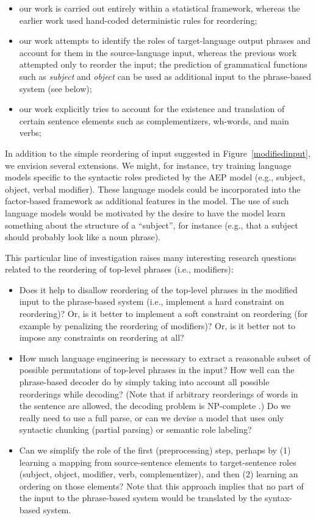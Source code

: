 \documentclass[10pt]{report}
\theoremstyle{plain}
\begin{document}
{\begin{itemize}
\item our work is carried out entirely within a statistical
framework, whereas the earlier work used hand-coded deterministic
rules for reordering;
\item our work attempts to identify the roles of target-language
output phrases and account for them in the source-language input,
whereas the previous work attempted only to reorder the input; the
prediction of grammatical functions such as {\em subject} and {\em
object} can be used as additional input to the phrase-based system
(see below);
\item our work explicitly tries to account for the existence and
translation of certain sentence elements such as complementizers,
wh-words, and main verbs;
\end{itemize}

In addition to the simple reordering of input suggested in
Figure~\ref{modifiedinput}, we envision several extensions. We might,
for instance, try training language models specific to the syntactic
roles predicted by the AEP model (e.g., subject, object, verbal
modifier). These language models could be incorporated into the
factor-based framework as additional features in the model. The use of
such language models would be motivated by the desire to have the
model learn something about the structure of a ``subject'', for
instance (e.g., that a subject should probably look like a noun
phrase).

This particular line of investigation raises many interesting research
questions related to the reordering of top-level phrases (i.e.,
modifiers):

\begin{itemize}
\item Does it help to disallow reordering of the top-level phrases in
the modified input to the phrase-based system (i.e., implement a hard
constraint on reordering)?  Or, is it better to implement a soft
constraint on reordering (for example by penalizing the reordering of
modifiers)?  Or, is it better not to impose any constraints on
reordering at all?
\item How much language engineering is necessary to extract a
reasonable subset of possible permutations of top-level phrases in the
input?  How well can the phrase-based decoder do by simply taking into
account all possible reorderings while decoding? (Note that if
arbitrary reorderings of words in the sentence are allowed, the
decoding problem is NP-complete .) Do we really need to
use a full parse, or can we devise a model that uses only syntactic
chunking (partial parsing) or semantic role labeling?
\item Can we simplify the role of the first (preprocessing) step,
perhaps by (1) learning a mapping from source-sentence elements to
target-sentence roles (subject, object, modifier, verb,
complementizer), and then (2) learning an ordering on those elements?
Note that this approach implies that no part of the input to the
phrase-based system would be translated by the syntax-based system.
\end{itemize}

}
\end{document}
